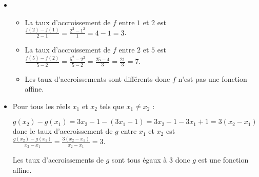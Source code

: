 \setcounter{exm}{0}
\begin{exm}
    \begin{itemize}
    \item 
        \begin{itemize}
        \item La taux d'accroissement de $f$ entre $1$ et $2$ est $\frac{f(2)-f(1)}{2-1}=\frac{2^2-1^2}{1}=4-1=3$.
        \item La taux d'accroissement de $f$ entre $2$ et $5$ est $\frac{f(5)-f(2)}{5-2}=\frac{5^2-2^2}{5-2}=\frac{25-4}{3}=\frac{21}{3}=7$.
        \item Les taux d'accroissements sont différents donc $f$ n'est pas une fonction affine.
        \end{itemize}
    \item Pour tous les réels $x_1$ et $x_2$ tels que $x_1\neq x_2$ : 
    
    $g(x_2)-g(x_1)=3x_2-1-(3x_1-1)=3x_2-1-3x_1+1=3(x_2-x_1)$ donc le taux d'accroissement de $g$ entre $x_1$ et $x_2$ est  $\frac{g(x_2)-g(x_1)}{x_2-x_1}=\frac{3(x_2-x_1)}{x_2-x_1}=3$.

Les taux d'accroissements de $g$ sont tous égaux à $3$ donc $g$ est une fonction affine.
    \end{itemize}
\end{exm}
